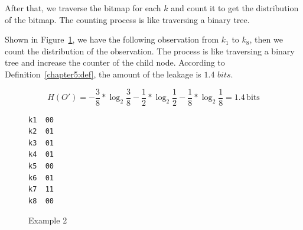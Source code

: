 After that, we traverse the bitmap for each $k$ and count it to get the distribution of the bitmap. The counting process is like traversing a binary tree.

\begin{myexample}
Shown in Figure~\ref{fig:design:example2}, we have the following observation from $k_1$ to $k_8$, then we count the distribution of  the observation. The process is like traversing a binary tree and increase the counter of the child node. According to Definition~\ref{chapter5:def}, the amount of the leakage is $1.4$ $\mathit{bits}$.

\begin{displaymath}
  H(O') = - \frac{3}{8}*\log_2{\frac{3}{8}}- \frac{1}{2}*\log_2{\frac{1}{2}}
  - \frac{1}{8}*\log_2{\frac{1}{8}} = 1.4 \,\mathrm{bits}
\end{displaymath}

\begin{figure}[h]
  \begin{minipage}{0.3\linewidth}
    \end{minipage}
  \hfill
  \begin{minipage}{0.2\linewidth}
    {
      \begin{lstlisting}[frame=none, numbers=none]
k1  00
k2  01
k3  01
k4  01
k5  00
k6  01
k7  11
k8  00
\end{lstlisting}
    }
  \end{minipage}
  \hfill
  \begin{minipage}{0.25\linewidth}
  \end{minipage}
  \caption{Example 2}\label{fig:design:example2}
\end{figure}
\end{myexample}


